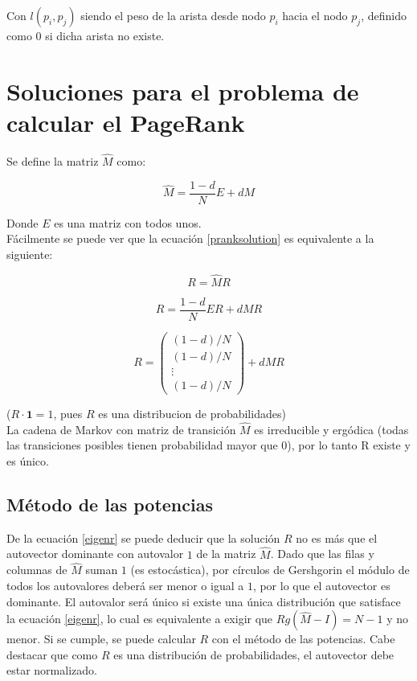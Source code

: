 \documentclass[%
    final,
    notitlepage,
    narroweqnarray,
    inline,
    twoside,
    invited
    ]{ieee}
\begin{document}
Con $l(p_{i},p_{j})$ siendo el peso de la arista desde nodo $p_{i}$ hacia el nodo $p_{j}$, definido como $0$ si dicha arista no existe.\\

\section{Soluciones para el problema de calcular el PageRank}

Se define la matriz $\widehat{M}$ como:

\begin{equation}\label{mhat}
\widehat{M} = \frac{1-d}{N}E + dM
\end{equation}

Donde $E$ es una matriz con todos unos.\\

Fácilmente se puede ver que la ecuación \eqref{pranksolution} es equivalente a la siguiente:

\begin{equation}\label{eigenr}
R = \widehat{M}R
\end{equation}

\[
    R = \frac{1-d}{N}ER + dMR
\]

\[
    R = \begin{pmatrix}
            (1-d)/N \\ (1-d)/N \\ \vdots \\ (1-d)/N
        \end{pmatrix} + dMR
\]

($R \cdot \mathbf 1 = 1$, pues $R$ es una distribucion de probabilidades)\\

La cadena de Markov con matriz de transición $\widehat{M}$ es irreducible y ergódica (todas las transiciones posibles tienen probabilidad mayor
que $0$), por lo tanto R existe y es único.

\subsection{Método de las potencias}

De la ecuación \eqref{eigenr} se puede deducir que la solución $R$ no es más que el autovector dominante con autovalor $1$ de la matriz $\widehat{M}$.
Dado que las filas y columnas de
$\widehat{M}$ suman $1$ (es estocástica), por círculos de Gershgorin el módulo de todos los autovalores deberá ser menor o igual a $1$, por lo que el autovector
es dominante. El autovalor será único si existe una única distribución que satisface la ecuación \eqref{eigenr}, lo cual es equivalente a exigir
que $Rg\left(\widehat{M}-I\right) = N-1$ y no menor.
Si se cumple, se puede calcular $R$ con el método de las potencias. Cabe destacar que como
$R$ es una distribución de probabilidades, el autovector debe estar normalizado.\\
\end{document}
